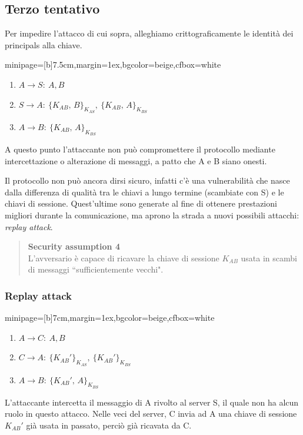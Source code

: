 \documentclass[a4paper, 11pt, twoside, openright, fleqn]{report}
\newcommand{\fromto}[2]{#1\rightarrow #2\!:\ }
\newenvironment{colbox}[2]%
{%
	\par\noindent\hspace{10pt}
	\begin{adjustbox}{minipage=[b]{#2},margin=1ex,bgcolor=#1,cfbox=white}
}{%
	\end{adjustbox}\newline%
}
\begin{document}
\subsection{Terzo tentativo}
Per impedire l'attacco di cui sopra, alleghiamo crittograficamente le identità dei principals alla chiave.
\begin{colbox}{beige}{7.5cm}
	\begin{enumerate}
		\item $\fromto{A}{S}A, B$
		\item $\fromto{S}{A}\{K_{AB},\,B\}_{K_{AS}},\ \{K_{AB},\,A\}_{K_{BS}}$
		\item $\fromto{A}{B}\{K_{AB},\,A\}_{K_{BS}}$
	\end{enumerate}
\end{colbox}
A questo punto l'attaccante non può compromettere il protocollo mediante intercettazione o alterazione di messaggi, a patto che A e B siano onesti.

Il protocollo non può ancora dirsi sicuro, infatti c'è una vulnerabilità che nasce dalla differenza di qualità tra le chiavi a lungo termine (scambiate con S) e le chiavi di sessione. Quest'ultime sono generate al fine di ottenere prestazioni migliori durante la comunicazione, ma aprono la strada a nuovi possibili attacchi: \emph{replay attack}.
\begin{quote}
	\textbf{Security assumption 4}\\
	L'avversario è capace di ricavare la chiave di sessione $K_{AB}$ usata in scambi di messaggi ``sufficientemente vecchi".
\end{quote}

\subsubsection{Replay attack}
\begin{colbox}{beige}{7cm}
	\begin{enumerate}
		\item $\fromto{A}{C}A, B$
		\item $\fromto{C}{A}\{K_{AB}'\}_{K_{AS}},\ \{K_{AB}'\}_{K_{BS}}$
		\item $\fromto{A}{B}\{K_{AB}',\,A\}_{K_{BS}}$
	\end{enumerate}
\end{colbox}
L'attaccante intercetta il messaggio di A rivolto al server S, il quale non ha alcun ruolo in questo attacco. Nelle veci del server, C invia ad A una chiave di sessione $K_{AB}'$ già usata in passato, perciò già ricavata da C.
\end{document}
